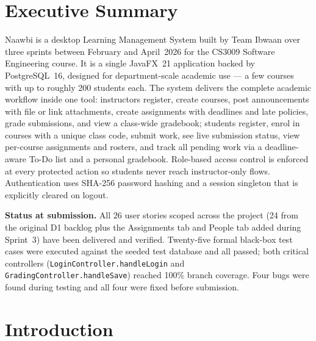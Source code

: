\documentclass[12pt, a4paper]{article}
\begin{document}
\tableofcontents
\newpage

\section*{Executive Summary}

Naawbi is a desktop Learning Management System built by Team Ibwaan over three
sprints between February and April~2026 for the CS3009 Software Engineering
course. It is a single JavaFX~21 application backed by PostgreSQL~16, designed
for department-scale academic use --- a few courses with up to roughly 200
students each. The system delivers the complete academic workflow inside one
tool: instructors register, create courses, post announcements with file or
link attachments, create assignments with deadlines and late policies, grade
submissions, and view a class-wide gradebook; students register, enrol in
courses with a unique class code, submit work, see live submission status,
view per-course assignments and rosters, and track all pending work via a
deadline-aware To-Do list and a personal gradebook. Role-based access control
is enforced at every protected action so students never reach instructor-only
flows. Authentication uses SHA-256 password hashing and a session singleton
that is explicitly cleared on logout.

\medskip
\noindent\textbf{Status at submission.}
All 26 user stories scoped across the project (24 from the original D1
backlog plus the Assignments tab and People tab added during Sprint~3) have
been delivered and verified. Twenty-five formal black-box test cases were
executed against the seeded test database and all passed; both critical
controllers (\texttt{LoginController.handleLogin} and
\texttt{GradingController.handleSave}) reached 100\% branch coverage. Four
bugs were found during testing and all four were fixed before submission.

\section{Introduction}
\end{document}
